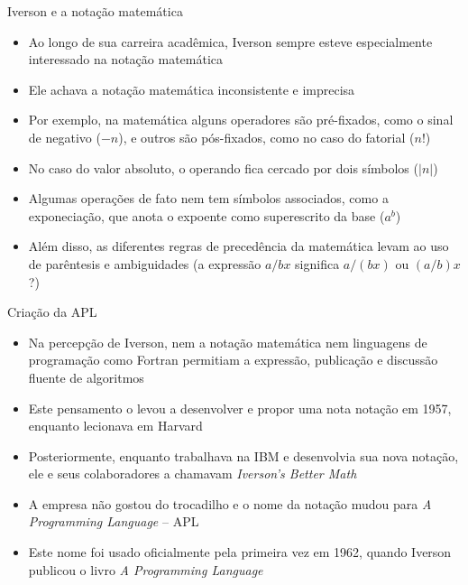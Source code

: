 \begin{frame}[fragile]{Iverson e a notação matemática}

    \begin{itemize}
        \item Ao longo de sua carreira acadêmica, Iverson sempre esteve especialmente interessado na notação matemática 
        \pause

        \item Ele achava a notação matemática inconsistente e imprecisa
        \pause

        \item Por exemplo, na matemática alguns operadores são pré-fixados, como o sinal de negativo ($-n$), e outros são pós-fixados, como no caso do fatorial ($n!$)
        \pause

        \item No caso do valor absoluto, o operando fica cercado por dois símbolos ($|n|$)
        \pause

        \item Algumas operações de fato nem tem símbolos associados, como a exponeciação, que anota o expoente como superescrito da base ($a^b$)
        \pause

        \item Além disso, as diferentes regras de precedência da matemática levam ao uso de parêntesis e ambiguidades (a expressão $a / bx$ significa $a / (bx)$ ou $(a/b)x$?)
    \end{itemize}

\end{frame}

\begin{frame}[fragile]{Criação da APL}

    \begin{itemize}
        \item Na percepção de Iverson, nem a notação matemática nem linguagens de programação como Fortran permitiam a expressão, publicação e discussão fluente de algoritmos 
        \pause

        \item Este pensamento o levou a desenvolver e propor uma nota notação em 1957, enquanto lecionava em Harvard
        \pause

        \item Posteriormente, enquanto trabalhava na IBM e desenvolvia sua nova notação, ele e seus colaboradores a chamavam \textit{Iverson's Better Math}

        \pause
        \item A empresa não gostou do trocadilho e o nome da notação mudou para \textit{A Programming Language} -- APL
        \pause

        \item Este nome foi usado oficialmente pela primeira vez em 1962, quando Iverson publicou o livro \textit{A Programming Language}
    \end{itemize}

\end{frame}

